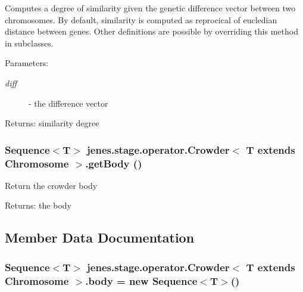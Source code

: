 Computes a degree of similarity given the genetic difference vector between two chromosomes. By default, similarity is computed as reprocical of eucledian distance between genes. Other definitions are possible by overriding this method in subclasses.

\begin{Desc}
\item[Parameters:]
\begin{description}
\item[{\em diff}]- the difference vector \end{description}
\end{Desc}
\begin{Desc}
\item[Returns:]similarity degree \end{Desc}
\hypertarget{classjenes_1_1stage_1_1operator_1_1_crowder_3_01_t_01extends_01_chromosome_01_4_4b24910de47aff7c5a709846af74b199}{
\subsubsection[getBody]{\setlength{\rightskip}{0pt plus 5cm}Sequence$<$T$>$ jenes.stage.operator.Crowder$<$ T extends Chromosome $>$.getBody ()}}
\label{classjenes_1_1stage_1_1operator_1_1_crowder_3_01_t_01extends_01_chromosome_01_4_4b24910de47aff7c5a709846af74b199}


Return the crowder body

\begin{Desc}
\item[Returns:]the body \end{Desc}


\subsection{Member Data Documentation}
\hypertarget{classjenes_1_1stage_1_1operator_1_1_crowder_3_01_t_01extends_01_chromosome_01_4_81522e76967039395a3567c866fa59ed}{
\subsubsection[body]{\setlength{\rightskip}{0pt plus 5cm}Sequence$<$T$>$ jenes.stage.operator.Crowder$<$ T extends Chromosome $>$.{\bf body} = new Sequence$<$T$>$()}}
\label{classjenes_1_1stage_1_1operator_1_1_crowder_3_01_t_01extends_01_chromosome_01_4_81522e76967039395a3567c866fa59ed}


